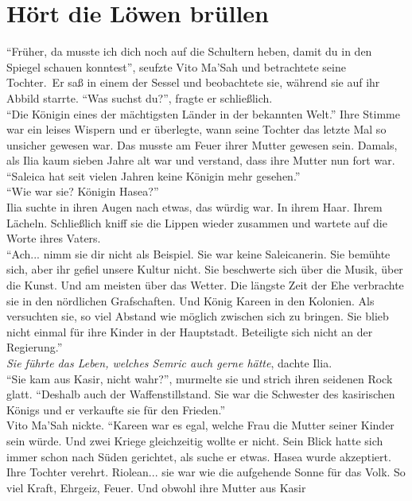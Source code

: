 \chapter{Hört die Löwen brüllen}

``Früher, da musste ich dich noch auf die Schultern heben, damit du in den Spiegel 
schauen konntest'', seufzte Vito Ma'Sah und betrachtete seine Tochter.\
Er saß in einem der Sessel und beobachtete sie, während sie auf ihr Abbild starrte. 
``Was suchst du?'', fragte er schließlich.\\
``Die Königin eines der mächtigsten Länder in der bekannten Welt.'' Ihre Stimme war ein 
leises Wispern und er überlegte, wann seine Tochter das letzte Mal so unsicher gewesen war. Das 
musste am Feuer ihrer Mutter gewesen sein. Damals, als Ilia kaum sieben Jahre alt war und verstand, 
dass ihre Mutter nun fort war.\\
``Saleica hat seit vielen Jahren keine Königin mehr gesehen.''\\
``Wie war sie? Königin Hasea?''\\
Ilia suchte in ihren Augen nach etwas, das würdig war. In ihrem Haar. Ihrem Lächeln. 
Schließlich kniff sie die Lippen wieder zusammen und wartete auf die Worte ihres Vaters.\\
``Ach... nimm sie dir nicht als Beispiel. Sie war keine Saleicanerin. Sie bemühte sich, aber ihr 
gefiel unsere Kultur nicht. Sie beschwerte sich über die Musik, über die Kunst. Und am meisten über 
das Wetter. Die längste Zeit der Ehe verbrachte sie in den nördlichen Grafschaften. Und König 
Kareen in den Kolonien. Als versuchten sie, so viel Abstand wie möglich zwischen sich zu bringen. 
Sie blieb nicht einmal für ihre Kinder in der Hauptstadt. Beteiligte sich nicht an der 
Regierung.''\\
\textit{Sie führte das Leben, welches Semric auch gerne hätte}, dachte Ilia.\\
``Sie kam aus Kasir, nicht wahr?'', murmelte sie und strich ihren seidenen Rock glatt. ``Deshalb 
auch der Waffenstillstand. Sie war die Schwester des kasirischen Königs und er verkaufte sie für den 
Frieden.''\\
Vito Ma'Sah nickte. ``Kareen war es egal, welche Frau die Mutter seiner Kinder sein würde. Und 
zwei Kriege gleichzeitig wollte er nicht. Sein Blick hatte sich immer schon nach Süden gerichtet, 
als suche er etwas. Hasea wurde akzeptiert. Ihre Tochter verehrt. Riolean... sie war wie die 
aufgehende Sonne für das Volk. So viel Kraft, Ehrgeiz, Feuer. Und obwohl ihre Mutter aus Kasir 
